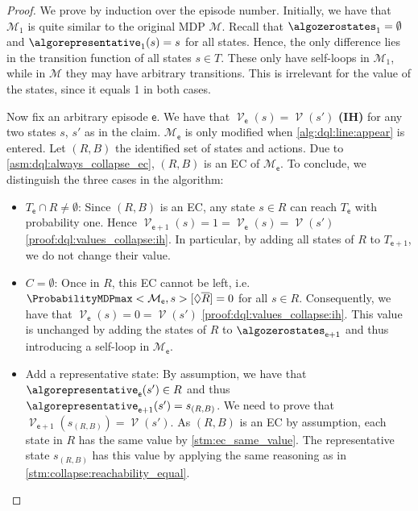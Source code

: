 \documentclass{theoretics}
\makeatletter
\newcommand{\intersectionSym}{\cap}
\newcommand{\intersectionBin}{\mathbin{\intersectionSym}}
\newcommand{\intersection}{\intersectionBin}
\newcommand{\MDP}{\mathcal{M}}
\newcommand{\reach}{\Diamond}
\DeclareMathOperator{\val}{\mathcal{V}}
\newcommand{\targetset}{T}
\newcommand{\algoepisode}{\mathsf{e}}
\def\alabel#1#2{\begingroup
	\textbf{(#2)}\def\@currentlabel{\textbf{[#2]}}\phantomsection\label{#1}\endgroup
}
\makeatother
\begin{document}
\begin{proof}
	We prove by induction over the episode number.
	Initially, we have that $\MDP_1$ is quite similar to the original MDP $\MDP$.
	Recall that $\algozerostates_1 = \emptyset$ and $\algorepresentative_1(s) = s$ for all states.
	Hence, the only difference lies in the transition function of all states $s \in \targetset$.
	These only have self-loops in $\MDP_1$, while in $\MDP$ they may have arbitrary transitions.
	This is irrelevant for the value of the states, since it equals 1 in both cases.

	Now fix an arbitrary episode $\algoepisode$.
	We have that $\val_\algoepisode(s) = \val(s')$ \alabel{proof:dql:values_collapse:ih}{IH} for any two states $s$, $s'$ as in the claim.
	$\MDP_\algoepisode$ is only modified when \cref{alg:dql:line:appear} is entered.
	Let $(R, B)$ the identified set of states and actions.
	Due to \cref{asm:dql:always_collapse_ec}, $(R, B)$ is an EC of $\MDP_\algoepisode$.
	To conclude, we distinguish the three cases in the algorithm:
	\begin{itemize}
		\item
		$\targetset_\algoepisode \intersection R \neq \emptyset$: Since $(R, B)$ is an EC, any state $s \in R$ can reach $\targetset_\algoepisode$ with probability one.
		Hence $\val_{\algoepisode + 1}(s) = 1 = \val_\algoepisode(s) = \val(s')$ \ref{proof:dql:values_collapse:ih}.
		In particular, by adding all states of $R$ to $\targetset_{\algoepisode + 1}$, we do not change their value.

		\item
		$C = \emptyset$: Once in $R$, this EC cannot be left, i.e.\ $\ProbabilityMDPmax<\MDP_\algoepisode, s>[\reach \overline{R}] = 0$ for all $s \in R$.
		Consequently, we have that $\val_\algoepisode(s) = 0 = \val(s')$ \ref{proof:dql:values_collapse:ih}.
		This value is unchanged by adding the states of $R$ to $\algozerostates_{\algoepisode + 1}$ and thus introducing a self-loop in $\MDP_\algoepisode$.

		\item
		Add a representative state:
		By assumption, we have that $\algorepresentative_\algoepisode(s') \in R$ and thus $\algorepresentative_{\algoepisode + 1}(s') = s_{(R, B)}$.
		We need to prove that $\val_{\algoepisode + 1}(s_{(R, B)}) = \val(s')$.
		As $(R, B)$ is an EC by assumption, each state in $R$ has the same value by \cref{stm:ec_same_value}.
		The representative state $s_{(R,B)}$ has this value by applying the same reasoning as in \cref{stm:collapse:reachability_equal}. \qedhere
	\end{itemize}
\end{proof}
\end{document}
